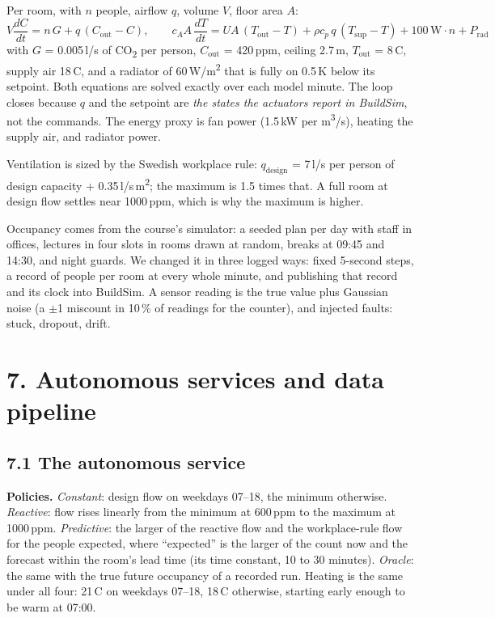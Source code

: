 \documentclass[11pt]{article}
\newcommand{\cotwo}{CO\textsubscript{2}}
\begin{document}
Per room, with $n$ people, airflow $q$, volume $V$, floor area $A$:
\[ V\frac{dC}{dt} = n\,G + q\,(C_\text{out}-C), \qquad
   c_A A\,\frac{dT}{dt} = U\!A\,(T_\text{out}-T) + \rho c_p\,q\,(T_\text{sup}-T) + 100\,\text{W}\cdot n + P_\text{rad} \]
with $G$ = 0.005\,l/s of \cotwo{} per person, $C_\text{out}$ = 420\,ppm, ceiling 2.7\,m,
$T_\text{out}$ = 8\,\textdegree C, supply air 18\,\textdegree C, and a radiator of
60\,W/m\textsuperscript{2} that is fully on 0.5\,K below its setpoint. Both equations are
solved exactly over each model minute. The loop closes because $q$ and the setpoint are
\emph{the states the actuators report in BuildSim}, not the commands. The energy proxy is
fan power (1.5\,kW per m\textsuperscript{3}/s), heating the supply air, and radiator power.

Ventilation is sized by the Swedish workplace rule: $q_\text{design}$ = 7\,l/s per person
of design capacity + 0.35\,l/s\,m\textsuperscript{2}; the maximum is 1.5 times that. A full
room at design flow settles near 1000\,ppm, which is why the maximum is higher.

Occupancy comes from the course's simulator: a seeded plan per day with staff in offices,
lectures in four slots in rooms drawn at random, breaks at 09:45 and 14:30, and night
guards. We changed it in three logged ways: fixed 5-second steps, a record of people per
room at every whole minute, and publishing that record and its clock into BuildSim.
A sensor reading is the true value plus Gaussian noise (a $\pm$1 miscount in 10\,\% of
readings for the counter), and injected faults: stuck, dropout, drift.

\section{7. Autonomous services and data pipeline}

\subsection{7.1 The autonomous service}

\textbf{Policies.} \emph{Constant}: design flow on weekdays 07--18, the minimum otherwise.
\emph{Reactive}: flow rises linearly from the minimum at 600\,ppm to the maximum at
1000\,ppm. \emph{Predictive}: the larger of the reactive flow and the workplace-rule flow
for the people expected, where ``expected'' is the larger of the count now and the
forecast within the room's lead time (its time constant, 10 to 30 minutes).
\emph{Oracle}: the same with the true future occupancy of a recorded run. Heating is the
same under all four: 21\,\textdegree C on weekdays 07--18, 18\,\textdegree C otherwise,
starting early enough to be warm at 07:00.
\end{document}
